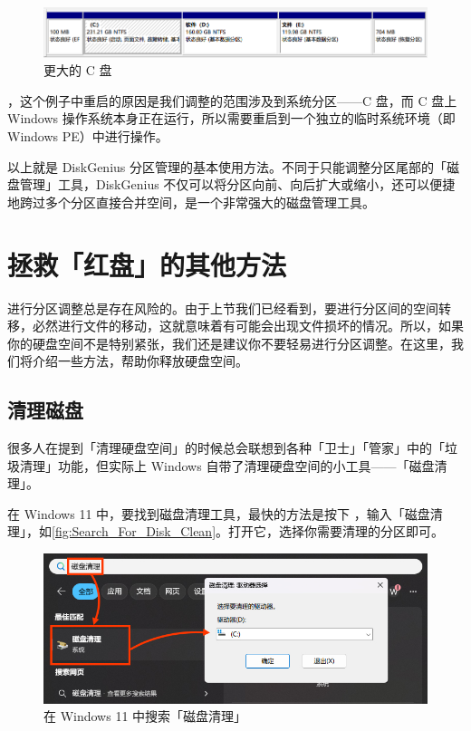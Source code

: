 {\begin{figure}[htb!]
  \centering
  \includegraphics[width=.9\textwidth]{assets/advanced/Larger_C.png}
  \caption{更大的 C 盘}
  \label{fig:Larger_C}
\end{figure}

\begin{note}
  ，这个例子中重启的原因是我们调整的范围涉及到系统分区——C 盘，而 C 盘上 Windows 操作系统本身正在运行，所以需要重启到一个独立的临时系统环境（即 Windows PE）中进行操作。
\end{note}

以上就是 DiskGenius 分区管理的基本使用方法。不同于只能调整分区尾部的「磁盘管理」工具，DiskGenius 不仅可以将分区向前、向后扩大或缩小，还可以便捷地跨过多个分区直接合并空间，是一个非常强大的磁盘管理工具。

\section{拯救「红盘」的其他方法}

进行分区调整总是存在风险的。由于上节我们已经看到，要进行分区间的空间转移，必然进行文件的移动，这就意味着有可能会出现文件损坏的情况。所以，如果你的硬盘空间不是特别紧张，我们还是建议你不要轻易进行分区调整。在这里，我们将介绍一些方法，帮助你释放硬盘空间。

\subsection{清理磁盘}

很多人在提到「清理硬盘空间」的时候总会联想到各种「卫士」「管家」中的「垃圾清理」功能，但实际上 Windows 自带了清理硬盘空间的小工具——「磁盘清理」。

在 Windows 11 中，要找到磁盘清理工具，最快的方法是按下 ，输入「磁盘清理」，如\autoref{fig:Search_For_Disk_Clean}。打开它，选择你需要清理的分区即可。

\begin{figure}[htb!]
  \centering
  \includegraphics[width=.72\textwidth]{assets/advanced/Search_For_Disk_Clean.jpg}
  \caption{在 Windows 11 中搜索「磁盘清理」}
  \label{fig:Search_For_Disk_Clean}
\end{figure}

}

